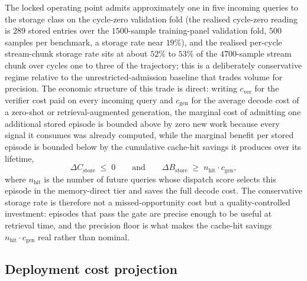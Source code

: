 The locked operating point admits approximately one in five incoming queries to the storage class on the cycle-zero validation fold (the realised cycle-zero reading is $289$ stored entries over the $1500$-sample training-panel validation fold, $500$ samples per benchmark, a storage rate near $19\%$), and the realised per-cycle stream-chunk storage rate sits at about $52\%$ to $53\%$ of the $4700$-sample stream chunk over cycles one to three of the trajectory; this is a deliberately conservative regime relative to the unrestricted-admission baseline that trades volume for precision. The economic structure of this trade is direct: writing $c_{\text{ver}}$ for the verifier cost paid on every incoming query and $c_{\text{gen}}$ for the average decode cost of a zero-shot or retrieval-augmented generation, the marginal cost of admitting one additional stored episode is bounded above by zero new work because every signal it consumes was already computed, while the marginal benefit per stored episode is bounded below by the cumulative cache-hit savings it produces over its lifetime,
\begin{equation}
\Delta C_{\text{store}} \;\le\; 0
\qquad\text{and}\qquad
\Delta B_{\text{store}} \;\ge\; n_{\text{hit}} \cdot c_{\text{gen}},
\label{eq:storage-cost-benefit}
\end{equation}
where $n_{\text{hit}}$ is the number of future queries whose dispatch score selects this episode in the memory-direct tier and saves the full decode cost. The conservative storage rate is therefore not a missed-opportunity cost but a quality-controlled investment: episodes that pass the gate are precise enough to be useful at retrieval time, and the precision floor is what makes the cache-hit savings $n_{\text{hit}} \cdot c_{\text{gen}}$ real rather than nominal.

\subsection{Deployment cost projection}
\label{sec:econ-deployment}

